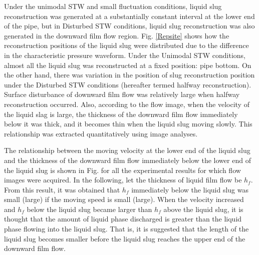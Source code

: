 \documentclass[aps,pre,preprint,groupedaddress,showkeys]{revtex4-2}
\begin{document}
Under the unimodal STW and small fluctuation conditions, liquid slug reconstruction was generated at a substantially constant interval at the lower end of the pipe, but in Disturbed STW conditions, liquid slug reconstruction was also generated in the downward film flow region.
Fig. \ref{Repsite} shows how the reconstruction positions of the liquid slug were distributed due to the difference in the characteristic pressure waveform.
Under the Unimodal STW conditions, almost all the liquid slug was reconstructed at a fixed position: pipe bottom.
On the other hand, there was variation in the position of slug reconstruction position under the Disturbed STW conditions (hereafter termed halfway reconstruction).
Surface disturbance of downward film flow was relatively large when halfway reconstruction occurred.
Also, according to the flow image, when the velocity of the liquid slag is large, the thickness of the downward film flow immediately below it was thick, and it becomes thin when the liquid slug moving slowly.
This relationship was extracted quantitatively using image analyses.

The relationship between the moving velocity at the lower end of the liquid slug and the thickness of the downward film flow immediately below the lower end of the liquid slug is shown in Fig.  for all the experimental results for which flow images were acquired.
In the following, let the thickness of liquid film flow be $h_f$.
From this result, it was obtained that $h_f$ immediately below the liquid slug was small (large) if the moving speed is small (large).
When the velocity increased and $h_f$ below the liquid slug became larger than $h_f$ above the liquid slug, it is thought that the amount of liquid phase discharged is greater than the liquid phase flowing into the liquid slug.
That is, it is suggested that the length of the liquid slug becomes smaller before the liquid slug reaches the upper end of the downward film flow.
\end{document}
